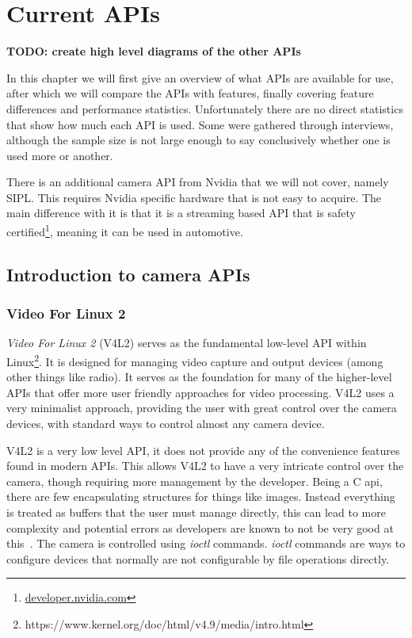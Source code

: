 \chapter{Current APIs\label{section:currentAPIs}}
\textbf{TODO: create high level diagrams of the other APIs}

In this chapter we will first give an overview of what APIs are available for
use, after which we will compare the APIs with features, finally covering
feature differences and performance statistics. Unfortunately there are no
direct statistics that show how much each API is used. Some were gathered
through interviews, although the sample size is not large enough to say
conclusively whether one is used more or another.

There is an additional camera API from Nvidia that we will not cover, namely
SIPL. This requires Nvidia specific hardware that is not easy to acquire. The
main difference with it is that it is a streaming based API that is safety
certified\footnote{\href{https://developer.nvidia.com/docs/drive/drive-os/6.0.8.1/public/drive-os-linux-sdk/common/topics/nvmedia\_concept\_nvsipl/PlatformCameraConfiguration.html}{developer.nvidia.com}},
meaning it can be used in automotive.

\section{Introduction to camera APIs}
\subsection{Video For Linux 2}\label{section:v4l2}
\textit{Video For Linux 2} (V4L2) serves as the fundamental low-level API
within Linux\footnote{https://www.kernel.org/doc/html/v4.9/media/intro.html}.
It is designed for managing video capture and output devices (among other things
like radio). It serves as the foundation for many of the higher-level APIs that
offer more user friendly approaches for video processing. V4L2 uses a very
minimalist approach, providing the user with great control over the camera
devices, with standard ways to control almost any camera device.

V4L2 is a very low level API, it does not provide any of the convenience
features found  in modern APIs. This allows V4L2 to have a very intricate
control over the camera, though requiring more management by the developer.
Being a C api, there are few encapsulating structures for things like images.
Instead everything is treated as buffers that the user must manage directly,
this can lead to more complexity and potential errors as developers are known
to not be very good at this~\cite{van2012memory}. The camera is controlled
using \textit{ioctl} commands. \textit{ioctl} commands are ways to configure
devices that normally are not configurable by file operations directly.

